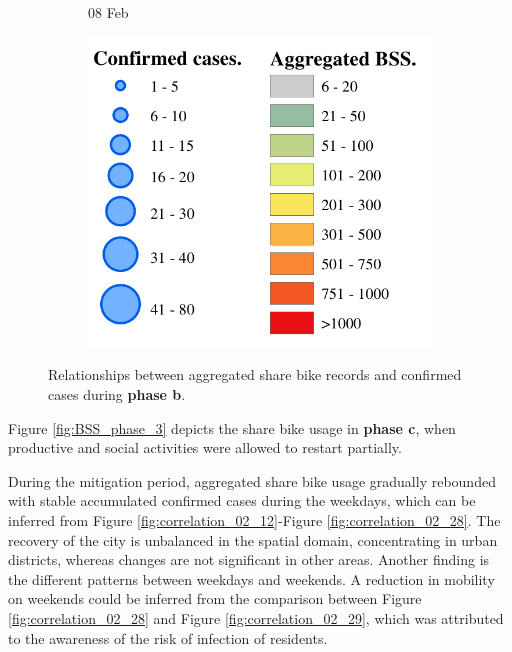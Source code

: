 \documentclass[ijgi,submit,moreauthors,pdftex]{Definitions/mdpi}
\begin{document}
\begin{figure}[!ht]
\begin{subfigure}{.3\textwidth}
\begin{tikzpicture}[inner sep = 0pt]
        \end{tikzpicture}
        \caption{08 Feb}
    \end{subfigure}
    \begin{subfigure}{.3\textwidth}
        \includegraphics[width=\textwidth]{Figures/Relation_with_confrimed_cases/legend7-eps-converted-to.pdf}
    \end{subfigure}
    \caption{Relationships between aggregated share bike records and confirmed cases during \textbf{phase b}.}
    \label{fig:BSS_phase1_2}
\end{figure}

Figure \ref{fig:BSS_phase_3} depicts the share bike usage in \textbf{phase c}, when productive and social activities were allowed to restart partially.

During the mitigation period, aggregated share bike usage gradually rebounded with stable accumulated confirmed cases during the weekdays, which can be inferred from Figure \ref{fig:correlation_02_12}-Figure \ref{fig:correlation_02_28}.
The recovery of the city is unbalanced in the spatial domain, concentrating in urban districts, whereas changes are not significant in other areas.
Another finding is the different patterns between weekdays and weekends.
A reduction in mobility on weekends could be inferred from the comparison between Figure \ref{fig:correlation_02_28} and Figure \ref{fig:correlation_02_29}, which was attributed to the awareness of the risk of infection of residents.
\end{document}
